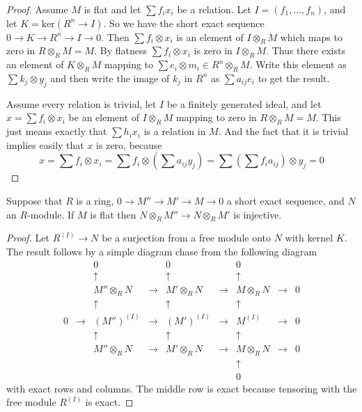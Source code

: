 \begin{proof}
Assume $M$ is flat and let $\sum f_i x_i$ be a relation.
Let $I = (f_1,\ldots,f_n)$, and let $K = \text{ker}(R^n \to I)$.
So we have the short exact sequence
$0\to K \to R^n \to I\to 0$. Then $\sum f_i \otimes x_i$
is an element of $I\otimes_R M$ which maps
to zero in $R\otimes_R M = M$. By flatness
$\sum f_i \otimes x_i$ is zero in $I\otimes_R M$.
Thus there exists an element of $K\otimes_R M$ mapping
to $\sum e_i \otimes m_i \in R^n\otimes_R M$.
Write this element as $\sum k_j \otimes y_j$
and then write the image of $k_j$ in $R^n$ as
$\sum a_{ij} e_i$ to get the result.

\medskip\noindent
Assume every relation is trivial, let $I$
be a finitely generated ideal, and let $x = \sum f_i\otimes x_i$
be an element of $I\otimes_R M$ mapping to zero in $R\otimes_R M = M$.
This just means exactly that $\sum h_i x_i$ is a relation in
$M$. And the fact that it is trivial implies easily that
$x$ is zero, because
$$
x
=
\sum f_i \otimes x_i
=
\sum f_i \otimes (\sum a_{ij}y_j)
=
\sum (\sum f_i a_{ij}) \otimes y_j
=
0
$$
\end{proof}

\begin{lemma}
\label{lemma-flat-tor-zero}
Suppose that $R$ is a ring, $0 \to M'' \to M' \to M \to 0$
a short exact sequence, and $N$ an $R$-module. If $M$ is flat
then $N\otimes_R M'' \to N\otimes_R M'$ is injective.
\end{lemma}

\begin{proof}
Let $R^{(I)} \to N$ be a surjection from a free module
onto $N$ with kernel $K$. The result follows
by a simple diagram chase from the following diagram
$$
\begin{matrix}
&
&
0
&
&
0
&
&
0
&
&
\\
&
&
\uparrow
&
&
\uparrow
&
&
\uparrow
&
&
\\
&
&
M''\otimes_R N
&
\to
&
M' \otimes_R N
&
\to
&
M\otimes_R N
&
\to
&
0
\\
&
&
\uparrow
&
&
\uparrow
&
&
\uparrow
&
&
\\
0
&
\to
&
(M'')^{(I)}
&
\to
&
(M')^{(I)}
&
\to
&
M^{(I)}
&
\to
&
0
\\
&
&
\uparrow
&
&
\uparrow
&
&
\uparrow
&
&
\\
&
&
M''\otimes_R N
&
\to
&
M' \otimes_R N
&
\to
&
M\otimes_R N
&
\to
&
0
\\
&
&
&
&
&
&
\uparrow
&
&
\\
&
&
&
&
&
&
0
&
&
\end{matrix}
$$
with exact rows and columns. The middle row is exact because tensoring
with the free module $R^{(I)}$ is exact.
\end{proof}


